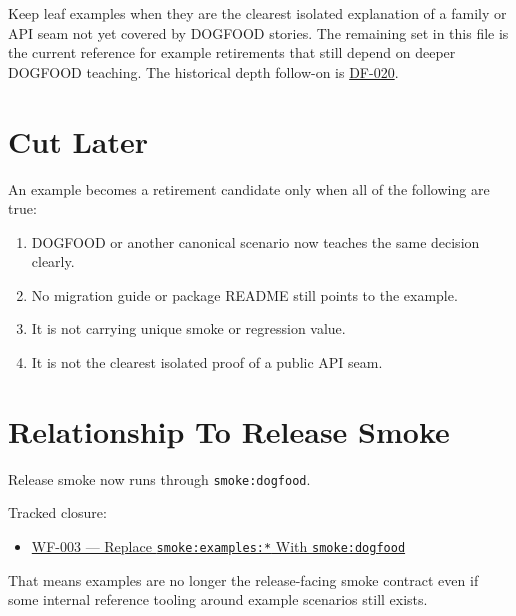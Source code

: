 Keep leaf examples when they are the clearest isolated explanation of a family or API seam not yet covered by DOGFOOD stories. The remaining set in this file is the current reference for example retirements that still depend on deeper DOGFOOD teaching. The historical depth follow-on is \href{https://github.com/flyingrobots/bijou/blob/cbd70612140e7a450d764b3c7be1c6af878b99bc/docs/method/retro/DF-020-deepen-dogfood-story-depth-and-variant-quality.md}{DF-020}.

\section{Cut Later}\label{record-007-cut-later}

An example becomes a retirement candidate only when all of the following are true:

\begin{enumerate}
\def\labelenumi{\arabic{enumi}.}
\tightlist
\item
  DOGFOOD or another canonical scenario now teaches the same decision clearly.
\item
  No migration guide or package README still points to the example.
\item
  It is not carrying unique smoke or regression value.
\item
  It is not the clearest isolated proof of a public API seam.
\end{enumerate}

\section{Relationship To Release Smoke}\label{record-007-relationship-to-release-smoke}

Release smoke now runs through \texttt{s\allowbreak{}m\allowbreak{}o\allowbreak{}k\allowbreak{}e\allowbreak{}:\allowbreak{}d\allowbreak{}o\allowbreak{}g\allowbreak{}f\allowbreak{}o\allowbreak{}o\allowbreak{}d}.

Tracked closure:

\begin{itemize}
\tightlist
\item
  \href{https://github.com/flyingrobots/bijou/blob/cbd70612140e7a450d764b3c7be1c6af878b99bc/docs/design/WF-003-replace-smoke-examples-with-smoke-dogfood.md}{WF-003 --- Replace \texttt{s\allowbreak{}m\allowbreak{}o\allowbreak{}k\allowbreak{}e\allowbreak{}:\allowbreak{}e\allowbreak{}x\allowbreak{}a\allowbreak{}m\allowbreak{}p\allowbreak{}l\allowbreak{}e\allowbreak{}s\allowbreak{}:\allowbreak{}*} With \texttt{s\allowbreak{}m\allowbreak{}o\allowbreak{}k\allowbreak{}e\allowbreak{}:\allowbreak{}d\allowbreak{}o\allowbreak{}g\allowbreak{}f\allowbreak{}o\allowbreak{}o\allowbreak{}d}}
\end{itemize}

That means examples are no longer the release-facing smoke contract even if some internal reference tooling around example scenarios still exists.

